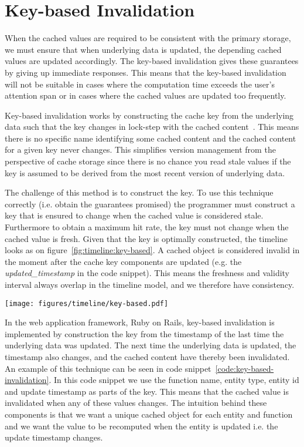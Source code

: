 
\section{Key-based Invalidation}
\label{subsec:key_based_invalidation}

When the cached values are required to be consistent with the primary storage, we must ensure that when underlying data is updated, the depending cached values are updated accordingly. The key-based invalidation gives these guarantees by giving up immediate responses. This means that the key-based invalidation will not be suitable in cases where the computation time exceeds the user's attention span or in cases where the cached values are updated too frequently.

Key-based invalidation works by constructing the cache key from the underlying data such that the key changes in lock-step with the cached content~\cite{blog:key-based-invalidation}. This means there is no specific name identifying some cached content and the cached content for a given key never changes. This simplifies version management from the perspective of cache storage since there is no chance you read stale values if the key is assumed to be derived from the most recent version of underlying data.

The challenge of this method is to construct the key. To use this technique correctly (i.e. obtain the guarantees promised) the programmer must construct a key that is ensured to change when the cached value is considered stale. Furthermore to obtain a maximum hit rate, the key must not change when the cached value is fresh. Given that the key is optimally constructed, the timeline looks as on figure~\ref{fig:timeline:key-based}. A cached object is considered invalid in the moment after the cache key components are updated (e.g. the \emph{updated\_timestamp} in the code snippet). This means the freshness and validity interval always overlap in the timeline model, and we therefore have consistency.

\begin{figure*}[ht!]
  \centering
  \texttt{[image: figures/timeline/key-based.pdf]}
  \caption{The lifecycle of the key-based invalidation technique}
  \label{fig:timeline:key-based}
\end{figure*}

In the web application framework, Ruby on Rails, key-based invalidation is implemented by construction the key from the timestamp of the last time the underlying data was updated. The next time the underlying data is updated, the timestamp also changes, and the cached content have thereby been invalidated. An example of this technique can be seen in code snippet~\ref{code:key-based-invalidation}. In this code snippet we use the function name, entity type, entity id and update timestamp as parts of the key. This means that the cached value is invalidated when any of these values changes. The intuition behind these components is that we want a unique cached object for each entity and function and we want the value to be recomputed when the entity is updated i.e. the update timestamp changes.

